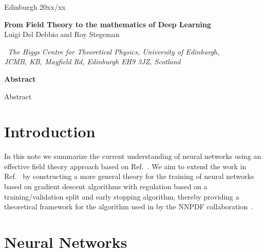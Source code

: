 \documentclass[11pt,a4paper]{article}
\begin{document}
\vspace{-2.0cm}
\begin{flushright}
  Edinburgh 20xx/xx
\end{flushright}
\vspace{0.3cm}

\begin{center}
  {\Large \bf From Field Theory to the mathematics of Deep Learning}\\
  \vspace{1.1cm}
  {\small
    Luigi Del Debbio and Roy Stegeman
  }\\

  \vspace{0.7cm}

  {\it \small
  ~The Higgs Centre for Theoretical Physics, University of Edinburgh,\\
  JCMB, KB, Mayfield Rd, Edinburgh EH9 3JZ, Scotland
  }

  \vspace{1.0cm}

  {\bf \large Abstract}
\end{center}

Abstract

\clearpage

\tableofcontents


\section{Introduction}
In this note we summarize the current understanding of neural networks using an effective field theory approach based on Ref.~\cite{Roberts:2021fes}. We aim to extend the work in Ref.~\cite{Roberts:2021fes} by constructing a more general theory for the training of neural networks based on gradient descent algorithms with regulation based on a training/validation split and early stopping algorithm, thereby providing a theoretical framework for the algorithm used in by the NNPDF collaboration~\cite{NNPDF:2021njg}.


\section{Neural Networks}
\end{document}
